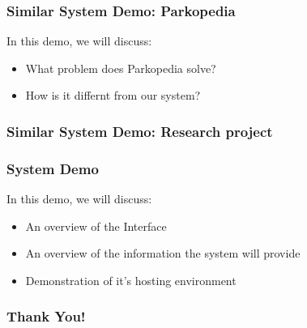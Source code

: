 \documentclass{beamer}
\begin{document}
\begin{frame}
    \frametitle{Similar System Demo: Parkopedia}
    In this demo, we will discuss:
    \begin{itemize}
        \item{What problem does Parkopedia solve?}
        \item{How is it differnt from our system?}
    \end{itemize}

\end{frame}

\begin{frame}
    \frametitle{Similar System Demo: Research project}
\end{frame}


\begin{frame}
    \frametitle{System Demo}
    In this demo, we will discuss:
    \begin{itemize}
        \item{An overview of the Interface}
        \item{An overview of the information the system will provide}
        \item{Demonstration of it's hosting environment}
    \end{itemize}
\end{frame}


\begin{frame}
    \frametitle{Thank You!}
\end{frame}
\end{document}
